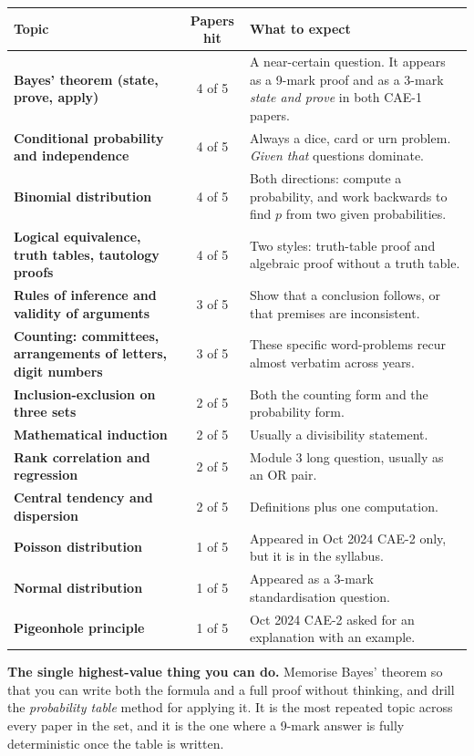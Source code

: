 \documentclass[11pt,a4paper]{article}
\begin{document}
\begin{center}\small
\begin{tabularx}{\textwidth}{>{\bfseries}p{} c X}
\toprule Topic & Papers hit & What to expect\\\midrule
Bayes' theorem (state, prove, apply) & 4 of 5 & A near-certain question. It appears as a 9-mark proof and as a 3-mark \emph{state and prove} in both CAE-1 papers.\\
Conditional probability and independence & 4 of 5 & Always a dice, card or urn problem. \emph{Given that} questions dominate.\\
Binomial distribution & 4 of 5 & Both directions: compute a probability, and work backwards to find $p$ from two given probabilities.\\
Logical equivalence, truth tables, tautology proofs & 4 of 5 & Two styles: truth-table proof and algebraic proof without a truth table.\\
Rules of inference and validity of arguments & 3 of 5 & Show that a conclusion follows, or that premises are inconsistent.\\
Counting: committees, arrangements of letters, digit numbers & 3 of 5 & These specific word-problems recur almost verbatim across years.\\
Inclusion-exclusion on three sets & 2 of 5 & Both the counting form and the probability form.\\
Mathematical induction & 2 of 5 & Usually a divisibility statement.\\
Rank correlation and regression & 2 of 5 & Module 3 long question, usually as an OR pair.\\
Central tendency and dispersion & 2 of 5 & Definitions plus one computation.\\
Poisson distribution & 1 of 5 & Appeared in Oct 2024 CAE-2 only, but it is in the syllabus.\\
Normal distribution & 1 of 5 & Appeared as a 3-mark standardisation question.\\
Pigeonhole principle & 1 of 5 & Oct 2024 CAE-2 asked for an explanation with an example.\\\bottomrule
\end{tabularx}
\end{center}

\begin{exambox}
\textbf{The single highest-value thing you can do.} Memorise Bayes' theorem so that you can write both the formula and a full proof without thinking, and drill the \emph{probability table} method for applying it. It is the most repeated topic across every paper in the set, and it is the one where a 9-mark answer is fully deterministic once the table is written.
\end{exambox}
\end{document}
